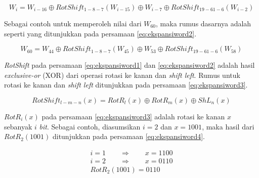\begin{equation}
	W_i = W_{i-16} \oplus RotShift_{1-8-7}(W_{i-15}) \oplus W_{i-7} \oplus RotShift_{19-61-6}(W_{i-2}) \label{eq:ekspansiword1}
\end{equation}

Sebagai contoh untuk memperoleh nilai dari \begin{math}W_{60}\end{math}, maka rumus dasarnya adalah seperti yang ditunjukkan pada persamaan \ref{eq:ekspansiword2}.

\begin{equation}
	W_{60} = W_{44} \oplus RotShift_{1-8-7}(W_{45}) \oplus W_{53} \oplus RotShift_{19-61-6}(W_{58}) \label{eq:ekspansiword2}
\end{equation}

\textit{RotShift} pada persamaan \ref{eq:ekspansiword1} dan \ref{eq:ekspansiword2} adalah hasil \textit{exclusive-or} (XOR) dari operasi rotasi ke kanan dan \textit{shift left}. Rumus untuk rotasi ke kanan dan \textit{shift left} ditunjukkan pada persamaan \ref{eq:ekspansiword3}.

\begin{equation}
	RotShift_{l-m-n}(x) = RotR_l(x) \oplus RotR_m(x) \oplus ShL_n(x) \label{eq:ekspansiword3}
\end{equation}

\begin{math}RotR_i(x)\end{math} pada persamaan \ref{eq:ekspansiword3} adalah rotasi ke kanan \begin{math}x\end{math} sebanyak \begin{math}i\end{math} \textit{bit}. Sebagai contoh, diasumsikan \begin{math}i=2\end{math} dan \begin{math}x=1001\end{math}, maka hasil dari \begin{math}RotR_2(1001)\end{math} ditunjukkan pada persamaan \ref{eq:ekspansiword4}.

\begin{align}
	i = 1 \qquad\Rightarrow\qquad x = 1100 \nonumber \\
	i = 2 \qquad\Rightarrow\qquad x = 0110 \label{eq:ekspansiword4} \\
	RotR_2(1001) = 0110 \nonumber
\end{align}

